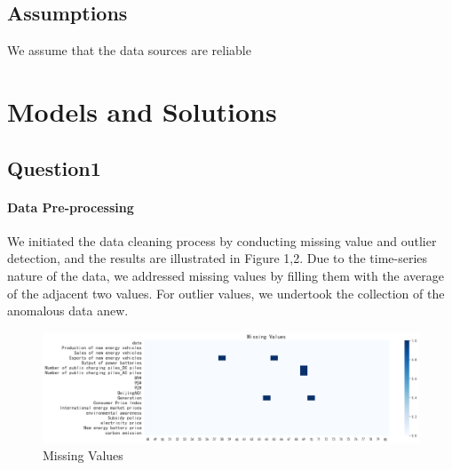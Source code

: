 \documentclass{apmcmthesis}
\begin{document}
\subsection{Assumptions}
We assume that the data sources are reliable
\section{Models and Solutions}

\subsection{Question1}
\paragraph{Data Pre-processing}
We initiated the data cleaning process by conducting missing value and outlier detection, and the results are illustrated in Figure 1,2. Due to the time-series nature of the data, we addressed missing values by filling them with the average of the adjacent two values. For outlier values, we undertook the collection of the anomalous data anew.
\begin{figure}[htbp]
    \centering
    \includegraphics[scale=0.4]{figures/Figure/问题一/数据预处理/Missing Values.png}
    \caption{Missing Values}
\end{figure}
\end{document}
